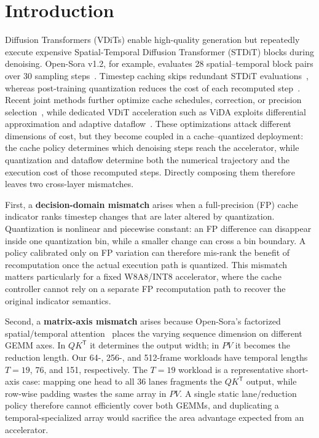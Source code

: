 \section{Introduction}
\label{sec:intro}

 Diffusion Transformers (VDiTs) enable high-quality generation but repeatedly execute expensive Spatial-Temporal Diffusion Transformer (STDiT) blocks during denoising. Open-Sora v1.2, for example, evaluates 28 spatial--temporal block pairs over 30 sampling steps~\cite{zheng2024opensora}. Timestep caching skips redundant STDiT evaluations~\cite{liu2025teacache}, whereas post-training quantization reduces the cost of each recomputed step~\cite{zhao2025viditq}. Recent joint methods further optimize cache schedules, correction, or precision selection~\cite{liu2025cachequant,wu2025quantcache}, while dedicated VDiT acceleration such as ViDA exploits differential approximation and adaptive dataflow~\cite{ding2025vida}. These optimizations attack different dimensions of cost, but they become coupled in a cache--quantized deployment: the cache policy determines which denoising steps reach the accelerator, while quantization and dataflow determine both the numerical trajectory and the execution cost of those recomputed steps. Directly composing them therefore leaves two cross-layer mismatches.

First, a \textbf{decision-domain mismatch} arises when a full-precision (FP) cache indicator ranks timestep changes that are later altered by quantization. Quantization is nonlinear and piecewise constant: an FP difference can disappear inside one quantization bin, while a smaller change can cross a bin boundary. A policy calibrated only on FP variation can therefore mis-rank the benefit of recomputation once the actual execution path is quantized. This mismatch matters particularly for a fixed W8A8/INT8 accelerator, where the cache controller cannot rely on a separate FP recomputation path to recover the original indicator semantics.

Second, a \textbf{matrix-axis mismatch} arises because Open-Sora's factorized spatial/temporal attention~\cite{zheng2024opensora} places the varying sequence dimension on different GEMM axes. In $QK^{\mathsf T}$ it determines the output width; in $PV$ it becomes the reduction length. Our 64-, 256-, and 512-frame workloads have temporal lengths $T=19$, 76, and 151, respectively. The $T=19$ workload is a representative short-axis case: mapping one head to all 36 lanes fragments the $QK^{\mathsf T}$ output, while row-wise padding wastes the same array in $PV$. A single static lane/reduction policy therefore cannot efficiently cover both GEMMs, and duplicating a temporal-specialized array would sacrifice the area advantage expected from an accelerator.

